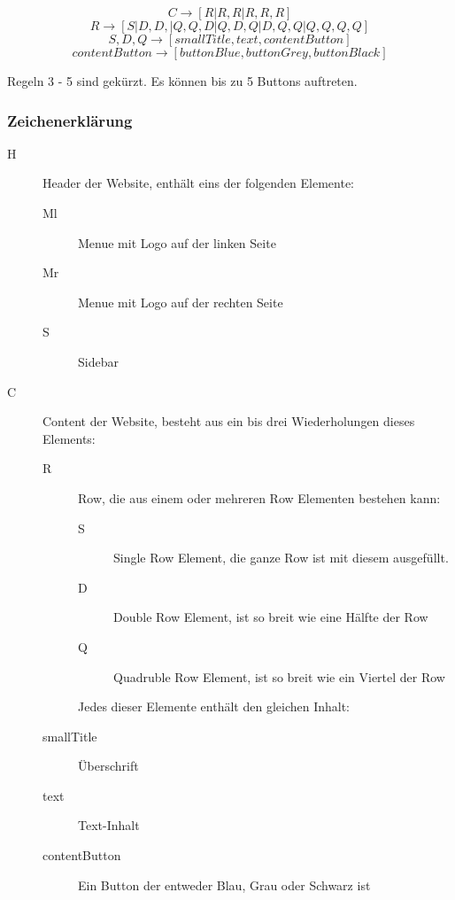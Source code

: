 \documentclass[pdftex,a4paper,halfparskip, article]{scrartcl}
\begin{document}
\begin{equation}
C \rightarrow [R | R, R | R, R, R ]
\end{equation}
\begin{equation}
R \rightarrow [S | D, D, | Q, Q, D | Q, D, Q | D, Q, Q | Q, Q, Q, Q]
\end{equation}
\begin{equation}
S, D, Q \rightarrow [smallTitle, text, contentButton]
\end{equation}
\begin{equation}
contentButton \rightarrow [buttonBlue, buttonGrey, buttonBlack]
\end{equation}

Regeln 3 - 5 sind gekürzt. Es können bis zu 5 Buttons auftreten.

\subsubsection{Zeichenerklärung}

\begin{description}
	\item[H] Header der Website, enthält eins der folgenden Elemente: 
	\begin{description}
		\item[Ml] Menue mit Logo auf der linken Seite
		\item[Mr] Menue mit Logo auf der rechten Seite
		\item[S] Sidebar	
	\end{description}
	\item[C] Content der Website, besteht aus ein bis drei Wiederholungen dieses Elements:
	\begin{description}
		\item[R] Row, die aus einem oder mehreren Row Elementen bestehen kann:
		\begin{description}
			\item[S] Single Row Element, die ganze Row ist mit diesem ausgefüllt.
			\item[D] Double Row Element, ist so breit wie eine Hälfte der Row
			\item[Q] Quadruble Row Element, ist so breit wie ein Viertel der Row
		\end{description}
		Jedes dieser Elemente enthält den gleichen Inhalt:
		\item[smallTitle] Überschrift
		\item[text] Text-Inhalt
		\item[contentButton] Ein Button der entweder Blau, Grau oder Schwarz ist 
	\end{description}
\end{description}
\end{document}
